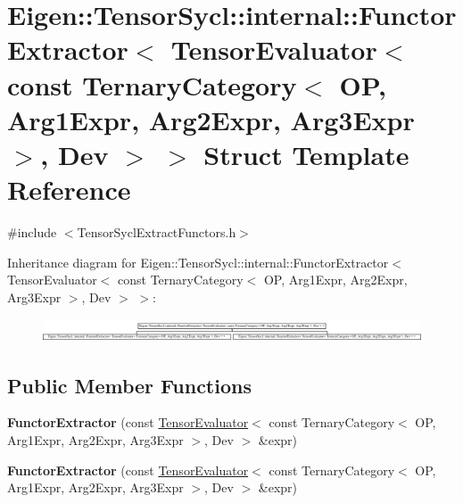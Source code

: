 \hypertarget{struct_eigen_1_1_tensor_sycl_1_1internal_1_1_functor_extractor_3_01_tensor_evaluator_3_01const_037059acf2b90c4daa8ccd3762a856f48}{}\section{Eigen\+:\+:Tensor\+Sycl\+:\+:internal\+:\+:Functor\+Extractor$<$ Tensor\+Evaluator$<$ const Ternary\+Category$<$ OP, Arg1\+Expr, Arg2\+Expr, Arg3\+Expr $>$, Dev $>$ $>$ Struct Template Reference}
\label{struct_eigen_1_1_tensor_sycl_1_1internal_1_1_functor_extractor_3_01_tensor_evaluator_3_01const_037059acf2b90c4daa8ccd3762a856f48}


{\ttfamily \#include $<$Tensor\+Sycl\+Extract\+Functors.\+h$>$}

Inheritance diagram for Eigen\+:\+:Tensor\+Sycl\+:\+:internal\+:\+:Functor\+Extractor$<$ Tensor\+Evaluator$<$ const Ternary\+Category$<$ OP, Arg1\+Expr, Arg2\+Expr, Arg3\+Expr $>$, Dev $>$ $>$\+:\begin{figure}[H]
\begin{center}
\leavevmode
\includegraphics[height=0.693928cm]{struct_eigen_1_1_tensor_sycl_1_1internal_1_1_functor_extractor_3_01_tensor_evaluator_3_01const_037059acf2b90c4daa8ccd3762a856f48}
\end{center}
\end{figure}
\subsection*{Public Member Functions}
\begin{DoxyCompactItemize}
\item 
\mbox{\label{struct_eigen_1_1_tensor_sycl_1_1internal_1_1_functor_extractor_3_01_tensor_evaluator_3_01const_037059acf2b90c4daa8ccd3762a856f48_a48e5807643bd90f1a5f702eeb5568335}} 
{\bfseries Functor\+Extractor} (const \hyperlink{struct_eigen_1_1_tensor_evaluator}{Tensor\+Evaluator}$<$ const Ternary\+Category$<$ OP, Arg1\+Expr, Arg2\+Expr, Arg3\+Expr $>$, Dev $>$ \&expr)
\item 
\mbox{\label{struct_eigen_1_1_tensor_sycl_1_1internal_1_1_functor_extractor_3_01_tensor_evaluator_3_01const_037059acf2b90c4daa8ccd3762a856f48_a48e5807643bd90f1a5f702eeb5568335}} 
{\bfseries Functor\+Extractor} (const \hyperlink{struct_eigen_1_1_tensor_evaluator}{Tensor\+Evaluator}$<$ const Ternary\+Category$<$ OP, Arg1\+Expr, Arg2\+Expr, Arg3\+Expr $>$, Dev $>$ \&expr)
\end{DoxyCompactItemize}
